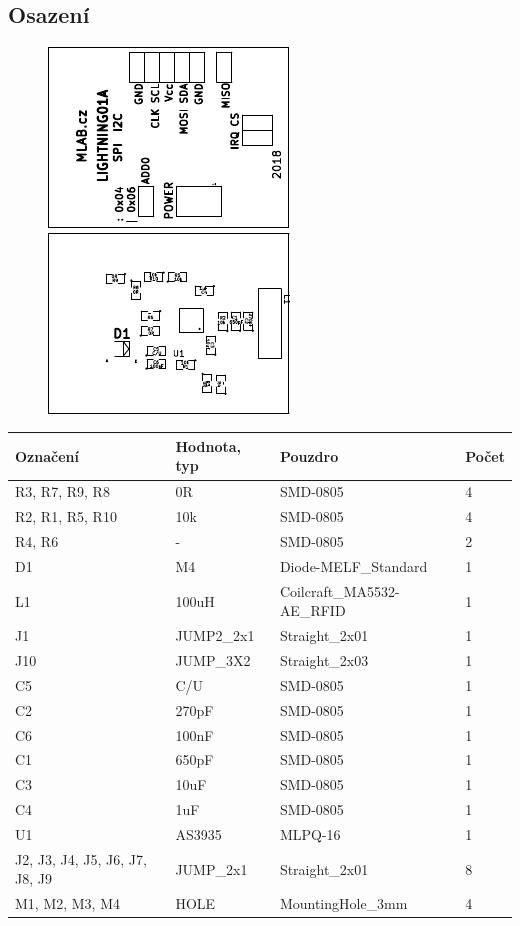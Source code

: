 \subsection{Osazení}


\begin{figure}[ht!]
	\centering
	\includegraphics[scale=2]{../../doc/src/LIGHTNING01A-top_cropped.pdf}
	\qquad
	\includegraphics[scale=2]{../../doc/src/LIGHTNING01A-bottom_cropped.pdf}
\end{figure}

\begin{center}
  \begin{tabular}{ | l | l | l | l |}
    \hline
    Označení & Hodnota, typ & Pouzdro & Počet \\ \hline
    \hline
			R3, R7, R9, R8 & 0R & SMD-0805 & 4\\ \hline
			R2, R1, R5, R10 & 10k & SMD-0805 & 4\\ \hline
			R4, R6 & - & SMD-0805 & 2\\ \hline
			D1 & M4 & Diode-MELF\_Standard & 1\\ \hline
			L1 & 100uH & Coilcraft\_MA5532-AE\_RFID & 1\\ \hline
			J1 & JUMP2\_2x1 & Straight\_2x01 & 1\\ \hline
			J10 & JUMP\_3X2 & Straight\_2x03 & 1\\ \hline
			C5 & C/U & SMD-0805 & 1\\ \hline
			C2 & 270pF & SMD-0805 & 1\\ \hline
			C6 & 100nF & SMD-0805 & 1\\ \hline
			C1 & 650pF & SMD-0805 & 1\\ \hline
			C3 & 10uF & SMD-0805 & 1\\ \hline
			C4 & 1uF & SMD-0805 & 1\\ \hline
			U1 & AS3935 & MLPQ-16 & 1\\ \hline
			J2, J3, J4, J5, J6, J7, J8, J9 & JUMP\_2x1 & Straight\_2x01 & 8\\ \hline
			M1, M2, M3, M4 & HOLE & MountingHole\_3mm & 4\\ \hline
	
  \end{tabular}
\end{center}